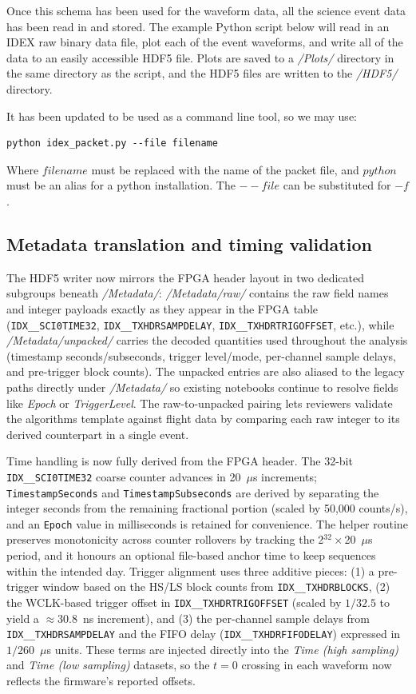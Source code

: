 Once this schema has been used for the waveform data, all the science event data has been read in and stored. The example Python script below will read in an IDEX raw binary data file, plot each of the event waveforms, and write all of the data to an easily accessible HDF5 file. Plots are saved to a \textit{/Plots/} directory in the same directory as the script, and the HDF5 files are written to the \textit{/HDF5/} directory.


It has been updated to be used as a command line tool, so we may use:
\begin{verbatim}
python idex_packet.py --file filename
\end{verbatim}
Where $filename$ must be replaced with the name of the packet file, and $python$ must be an alias for a python installation. The $--file$ can be substituted for $-f$.

\subsection{Metadata translation and timing validation}
The HDF5 writer now mirrors the FPGA header layout in two dedicated subgroups beneath \textit{/Metadata/}: \textit{/Metadata/raw/} contains the raw field names and integer payloads exactly as they appear in the FPGA table (\texttt{IDX\_\_SCI0TIME32}, \texttt{IDX\_\_TXHDRSAMPDELAY}, \texttt{IDX\_\_TXHDRTRIGOFFSET}, etc.), while \textit{/Metadata/unpacked/} carries the decoded quantities used throughout the analysis (timestamp seconds/subseconds, trigger level/mode, per-channel sample delays, and pre-trigger block counts). The unpacked entries are also aliased to the legacy paths directly under \textit{/Metadata/} so existing notebooks continue to resolve fields like \textit{Epoch} or \textit{TriggerLevel}. The raw-to-unpacked pairing lets reviewers validate the algorithms template against flight data by comparing each raw integer to its derived counterpart in a single event.

Time handling is now fully derived from the FPGA header. The 32-bit \texttt{IDX\_\_SCI0TIME32} coarse counter advances in 20~$\mu$s increments; \texttt{TimestampSeconds} and \texttt{TimestampSubseconds} are derived by separating the integer seconds from the remaining fractional portion (scaled by 50{,}000 counts/s), and an \texttt{Epoch} value in milliseconds is retained for convenience. The helper routine preserves monotonicity across counter rollovers by tracking the 2$^{32}$\,$\times$\,20~$\mu$s period, and it honours an optional file-based anchor time to keep sequences within the intended day. Trigger alignment uses three additive pieces: (1) a pre-trigger window based on the HS/LS block counts from \texttt{IDX\_\_TXHDRBLOCKS}, (2) the WCLK-based trigger offset in \texttt{IDX\_\_TXHDRTRIGOFFSET} (scaled by $1/32.5$ to yield a $\approx$30.8~ns increment), and (3) the per-channel sample delays from \texttt{IDX\_\_TXHDRSAMPDELAY} and the FIFO delay (\texttt{IDX\_\_TXHDRFIFODELAY}) expressed in $1/260$~$\mu$s units. These terms are injected directly into the \textit{Time (high sampling)} and \textit{Time (low sampling)} datasets, so the $t=0$ crossing in each waveform now reflects the firmware’s reported offsets.

